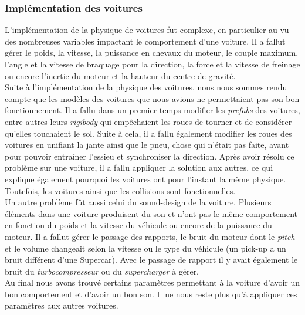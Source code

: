 \documentclass[12pt,a4paper]{article}
\begin{document}
            \subsubsection{Implémentation des voitures}
                L'implémentation de la physique de voitures fut complexe, en particulier au vu des 
                nombreuses variables impactant le comportement d'une voiture. Il a fallut gérer le 
                poids, la vitesse, la puissance en chevaux du moteur, le couple maximum, l'angle et la 
                vitesse de braquage pour la direction, la force et la vitesse de freinage ou encore 
                l'inertie du moteur et la hauteur du centre de gravité.\\
                Suite à l'implémentation de la physique des voitures, nous nous sommes rendu compte que 
                les modèles des voitures que nous avions ne permettaient pas son bon fonctionnement. Il 
                a fallu dans un premier temps modifier les \textit{prefabs} des voitures, entre autres 
                leurs \textit{rigibody} qui empêchaient les roues de tourner et de considérer qu'elles 
                touchaient le sol. Suite à cela, il a fallu également modifier les roues des voitures en
                unifiant la jante ainsi que le pneu, chose qui n'était pas faite, avant pour pouvoir 
                entraîner l'essieu et synchroniser la direction. Après avoir résolu ce problème sur une 
                voiture, il a fallu appliquer la solution aux autres, ce qui explique également pourquoi les 
                voitures ont pour l'instant la même physique. Toutefois, les voitures ainsi que les 
                collisions sont fonctionnelles.\\
                Un autre problème fût aussi celui du sound-design de la voiture. Plusieurs éléments dans
                une voiture produisent du son et n'ont pas le même comportement en fonction du poids et
                la vitesse du véhicule ou encore de la puissance du moteur. Il a fallut gérer le passage
                des rapports, le bruit du moteur dont le \textit{pitch} et le volume changeait selon la
                vitesse ou le type du véhicule (un pick-up a un bruit différent d'une Supercar). Avec le
                passage de rapport il y avait également le bruit du \textsl{turbocompresseur} ou du
                \textsl{supercharger} à gérer.\\
                Au final nous avons trouvé certains paramètres permettant à la voiture d'avoir un bon
                comportement et d'avoir un bon son. Il ne nous reste plus qu'à appliquer ces paramètres
                aux autres voitures.
\end{document}

